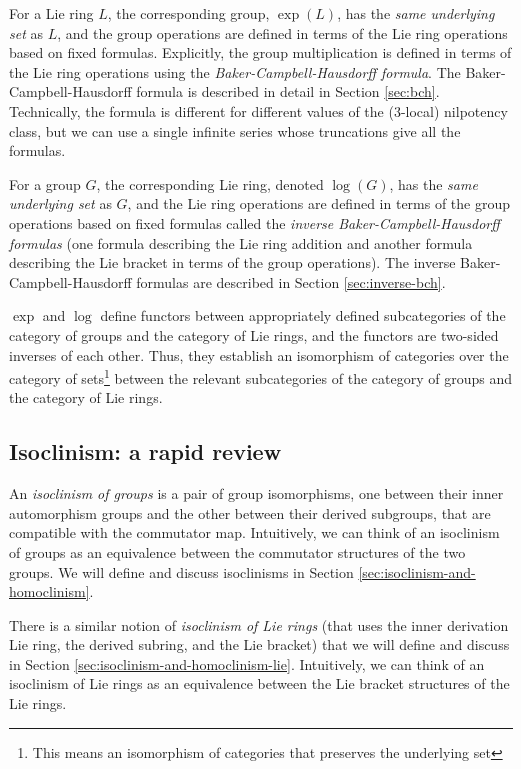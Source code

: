 For a Lie ring $L$, the corresponding group, $\exp(L)$, has the {\em
  same underlying set} as $L$, and the group operations are defined in
terms of the Lie ring operations based on fixed formulas. Explicitly,
the group multiplication is defined in terms of the Lie ring
operations using the {\em Baker-Campbell-Hausdorff formula}. The
Baker-Campbell-Hausdorff formula is described in detail in Section
\ref{sec:bch}. Technically, the formula is different for different
values of the ($3$-local) nilpotency class, but we can use a single
infinite series whose truncations give all the formulas.

For a group $G$, the corresponding Lie ring, denoted $\log(G)$, has
the {\em same underlying set} as $G$, and the Lie ring operations are
defined in terms of the group operations based on fixed formulas
called the {\em inverse Baker-Campbell-Hausdorff formulas} (one
formula describing the Lie ring addition and another formula
describing the Lie bracket in terms of the group operations). The
inverse Baker-Campbell-Hausdorff formulas are described in Section
\ref{sec:inverse-bch}.

$\exp$ and $\log$ define functors between appropriately defined
subcategories of the category of groups and the category of Lie rings,
and the functors are two-sided inverses of each other. Thus, they
establish an isomorphism of categories over the category of
sets\footnote{This means an isomorphism of categories that preserves
  the underlying set} between the relevant subcategories of the
category of groups and the category of Lie rings.

\subsection{Isoclinism: a rapid review}

An {\em isoclinism of groups} is a pair of group isomorphisms, one
between their inner automorphism groups and the other between their
derived subgroups, that are compatible with the commutator
map. Intuitively, we can think of an isoclinism of groups as an
equivalence between the commutator structures of the two groups. We
will define and discuss isoclinisms in Section
\ref{sec:isoclinism-and-homoclinism}. 

There is a similar notion of {\em isoclinism of Lie rings} (that uses
the inner derivation Lie ring, the derived subring, and the Lie
bracket) that we will define and discuss in Section
\ref{sec:isoclinism-and-homoclinism-lie}. Intuitively, we can think of
an isoclinism of Lie rings as an equivalence between the Lie bracket
structures of the Lie rings.

